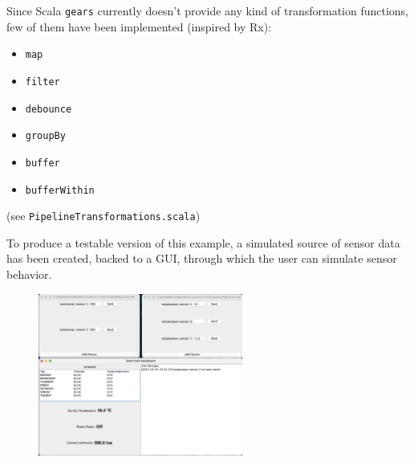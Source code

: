 \documentclass[aspectratio=1610,xcolor=dvipsnames]{beamer}
\begin{document}

\begin{frame}
  Since Scala \texttt{gears} currently doesn't provide any kind of transformation functions, few of them have been implemented (inspired by Rx):
  \begin{itemize}
      \item \texttt{map}
      \item \texttt{filter}
      \item \texttt{debounce}
      \item \texttt{groupBy}
      \item \texttt{buffer}
      \item \texttt{bufferWithin}
  \end{itemize}
  \footnotesize
  (see \texttt{PipelineTransformations.scala})
\end{frame}


\begin{frame}
  
\end{frame}


\begin{frame}
  \footnotesize
  To produce a testable version of this example, a simulated source of sensor data has been created, backed to a GUI, through which the user can simulate sensor behavior.
  \begin{figure}
      \centering
      \includegraphics[width=0.6\textwidth]{./images/smart-hub.png}
  \end{figure}
\end{frame}
\end{document}
